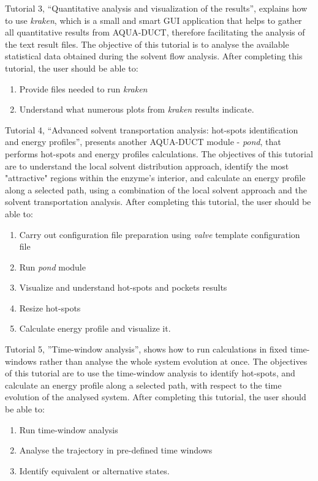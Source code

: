 \documentclass[9pt,tutorial]{livecoms}
\begin{document}
Tutorial 3, “Quantitative analysis and visualization of the results”, explains how to use \textit{kraken}, which is a small and smart GUI application that helps to gather all quantitative results from AQUA-DUCT, therefore facilitating the analysis of the text result files. The objective of this tutorial is to analyse the available statistical data obtained during the solvent flow analysis. After completing this tutorial, the user should be able to:
\begin{enumerate}
  \item Provide files needed to run \textit{kraken}
  \item Understand what numerous plots from \textit{kraken} results indicate.
\end{enumerate}

Tutorial 4, “Advanced solvent transportation analysis: hot-spots identification and energy profiles”, presents another AQUA-DUCT module - \textit{pond}, that performs hot-spots and energy profiles calculations. The objectives of this tutorial are to understand the local solvent distribution approach, identify the most "attractive" regions within the enzyme's interior, and calculate an energy profile along a selected path, using a combination of the local solvent approach and the solvent transportation analysis. After completing this tutorial, the user should be able to:
\begin{enumerate}
  \item Carry out configuration file preparation using \textit{valve} template configuration file
  \item Run \textit{pond} module
  \item Visualize and understand hot-spots and pockets results
  \item Resize hot-spots
  \item Calculate energy profile and visualize it.
\end{enumerate}

Tutorial 5, ”Time-window analysis”, shows how to run calculations in fixed time-windows rather than analyse the whole system evolution at once. The objectives of this tutorial are to use the time-window analysis to identify hot-spots, and calculate an energy profile along a selected path, with respect to the time evolution of the analysed system. After completing this tutorial, the user should be able to:
\begin{enumerate}
  \item Run time-window analysis
  \item Analyse the trajectory in pre-defined time windows 
  \item Identify equivalent or alternative states. 
\end{enumerate}
\end{document}
